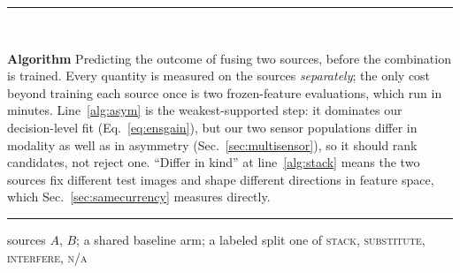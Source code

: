 \begin{table}[pos=htbp]
\label{alg:procedure}
\centering
\begin{minipage}{\columnwidth}
\rule{\linewidth}{0.8pt}\\[1pt]
{\footnotesize\textbf{Algorithm \thealgnum}\hspace{0.6em}Predicting the outcome of fusing two sources, before the
combination is trained. Every quantity is measured on the sources
\emph{separately}; the only cost beyond training each source once is two
frozen-feature evaluations, which run in minutes. Line~\ref{alg:asym} is
the weakest-supported step: it dominates our decision-level fit
(Eq.~\ref{eq:ensgain}), but our two sensor populations differ in modality
as well as in asymmetry (Sec.~\ref{sec:multisensor}), so it should rank
candidates, not reject one. ``Differ in kind'' at
line~\ref{alg:stack} means the two sources fix different test images and
shape different directions in feature space, which
Sec.~\ref{sec:samecurrency} measures directly.\par}
\vspace{1pt}\rule{\linewidth}{0.4pt}\par
\footnotesize
\vspace*{-\topsep}\vspace*{4pt}
\renewcommand{\algorithmicand}{\textnormal{and}}
\renewcommand{\algorithmicor}{\textnormal{or}}
\begin{algorithmic}[1]
\REQUIRE sources $A$, $B$; a shared baseline arm; a labeled split
\ENSURE one of \textsc{stack}, \textsc{substitute}, \textsc{interfere}, \textsc{n/a}

\end{algorithmic}
\end{minipage}
\end{table}
